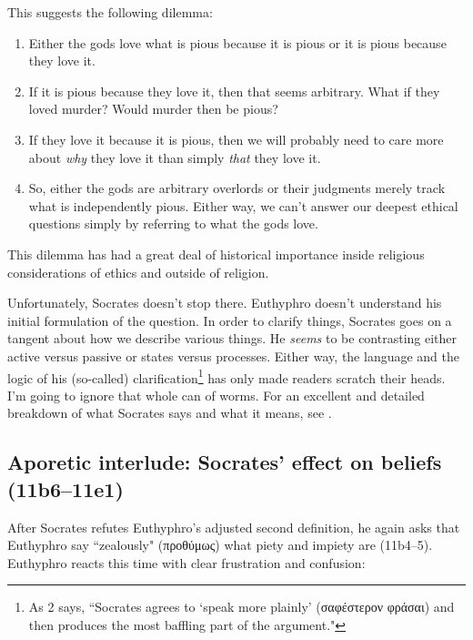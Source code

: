 \documentclass[11pt]{article}
\begin{document}
This suggests the following dilemma:

\begin{enumerate}

    \item Either the gods love what is pious because it is pious or it is
        pious because they love it.

    \item If it is pious because they love it, then that seems arbitrary.
        What if they loved murder?  Would murder then be pious?

    \item If they love it because it is pious, then we will probably need
        to care more about \emph{why} they love it than simply \emph{that}
        they love it.

    \item So, either the gods are arbitrary overlords or their judgments
        merely track what is independently pious.  Either way, we can't
        answer our deepest ethical questions simply by referring to what
        the gods love.

\end{enumerate}

This dilemma has had a great deal of historical importance inside religious
considerations of ethics and outside of religion.

Unfortunately, Socrates doesn't stop there.  Euthyphro doesn't understand
his initial formulation of the question.  In order to clarify things,
Socrates goes on a tangent about how we describe various things.  He
\emph{seems} to be contrasting either active versus passive or states
versus processes.  Either way, the language and the logic of his
(so-called) clarification\footnote{As \cite{cohen1971} 2 says, ``Socrates
agrees to `speak more plainly' ({\g σαφέστερον φράσαι}) and then produces
the most baffling part of the argument."} has only made readers scratch
their heads.  I'm going to ignore that whole can of worms.  For an excellent
and detailed breakdown of what Socrates says and what it means, see
\citet{cohen1971}.


\subsection{Aporetic interlude: Socrates' effect on beliefs (11b6--11e1)}

After Socrates refutes Euthyphro's adjusted second definition, he again
asks that Euthyphro say ``zealously" ({\g προθύμως}) what piety and impiety
are (11b4--5).  Euthyphro reacts this time with clear frustration and
confusion:
\end{document}
